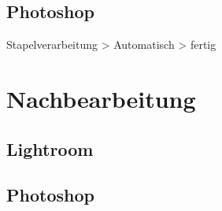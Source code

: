 \documentclass[liststotoc,bibtotoc,fontsize=14pt,]{scrreprt}
\begin{document}
	\section{Photoshop}
	\label{sec:photoshop}
	Stapelverarbeitung > Automatisch > fertig
	
	\chapter{Nachbearbeitung}
	\label{ch:nach}
	
	\section{Lightroom}
	\label{sec:lightroom}
	
	\section{Photoshop}
	\label{sec:photo}
	

	
	\begin{thebibliography}{999}
	
		
	\end{thebibliography}
	
\end{document}

